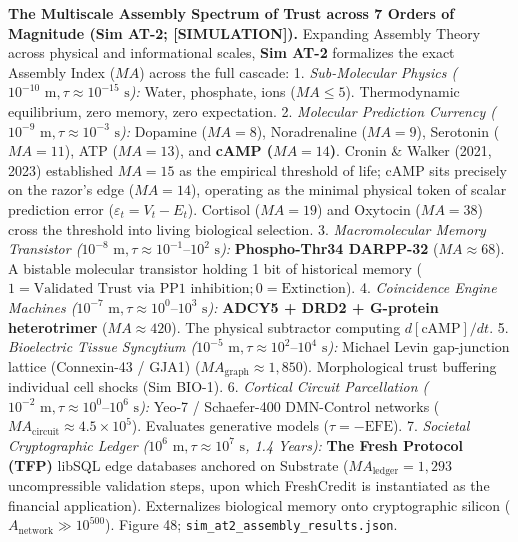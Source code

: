 \documentclass[
]{article}
\begin{document}
\textbf{The Multiscale Assembly Spectrum of Trust across 7 Orders of
Magnitude (Sim AT-2; {[}SIMULATION{]}).} Expanding Assembly Theory
across physical and informational scales, \textbf{Sim AT-2} formalizes
the exact Assembly Index (\(MA\)) across the full cascade: 1.
\emph{Sub-Molecular Physics
(\(10^{-10}\text{ m}, \tau \approx 10^{-15}\text{ s}\)):} Water,
phosphate, ions (\(MA \le 5\)). Thermodynamic equilibrium, zero memory,
zero expectation. 2. \emph{Molecular Prediction Currency
(\(10^{-9}\text{ m}, \tau \approx 10^{-3}\text{ s}\)):} Dopamine
(\(MA = 8\)), Noradrenaline (\(MA = 9\)), Serotonin (\(MA = 11\)), ATP
(\(MA = 13\)), and \textbf{cAMP (\(MA = 14\))}. Cronin \& Walker (2021,
2023) established \(MA = 15\) as the empirical threshold of life; cAMP
sits precisely on the razor's edge (\(MA = 14\)), operating as the
minimal physical token of scalar prediction error
(\(\varepsilon_t = V_t - E_t\)). Cortisol (\(MA = 19\)) and Oxytocin
(\(MA = 38\)) cross the threshold into living biological selection. 3.
\emph{Macromolecular Memory Transistor
(\(10^{-8}\text{ m}, \tau \approx 10^{-1}\text{–}10^2\text{ s}\)):}
\textbf{Phospho-Thr34 DARPP-32} (\(MA \approx 68\)). A bistable
molecular transistor holding 1 bit of historical memory
(\(1 = \text{Validated Trust via PP1 inhibition}; 0 = \text{Extinction}\)).
4. \emph{Coincidence Engine Machines
(\(10^{-7}\text{ m}, \tau \approx 10^0\text{–}10^3\text{ s}\)):}
\textbf{ADCY5 + DRD2 + G-protein heterotrimer} (\(MA \approx 420\)). The
physical subtractor computing \(d[\text{cAMP}]/dt\). 5.
\emph{Bioelectric Tissue Syncytium
(\(10^{-5}\text{ m}, \tau \approx 10^2\text{–}10^4\text{ s}\)):} Michael
Levin gap-junction lattice (Connexin-43 / GJA1)
(\(MA_{\text{graph}} \approx 1,850\)). Morphological trust buffering
individual cell shocks (Sim BIO-1). 6. \emph{Cortical Circuit
Parcellation
(\(10^{-2}\text{ m}, \tau \approx 10^0\text{–}10^6\text{ s}\)):} Yeo-7 /
Schaefer-400 DMN-Control networks
(\(MA_{\text{circuit}} \approx 4.5 \times 10^5\)). Evaluates generative
models (\(\tau = -\text{EFE}\)). 7. \emph{Societal Cryptographic Ledger
(\(10^6\text{ m}, \tau \approx 10^7\text{ s}\), 1.4 Years):} \textbf{The
Fresh Protocol (TFP)} libSQL edge databases anchored on Substrate
(\(MA_{\text{ledger}} = 1,293\) uncompressible validation steps, upon
which FreshCredit is instantiated as the financial application).
Externalizes biological memory onto cryptographic silicon
(\(A_{\text{network}} \gg 10^{500}\)). Figure 48;
\texttt{sim\_at2\_assembly\_results.json}.
\end{document}
